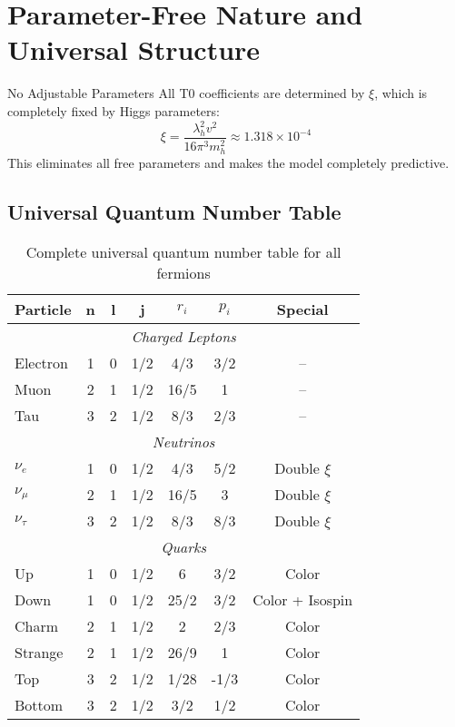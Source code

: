 \documentclass[12pt,a4paper]{article}
\begin{document}
	\section{Parameter-Free Nature and Universal Structure}
	\label{sec:parameter_free_nature}
	
	\begin{important}{No Adjustable Parameters}{}
		All T0 coefficients are determined by $\xi$, which is completely fixed by Higgs parameters:
		\begin{equation}
			\xi = \frac{\lambda_h^2 v^2}{16\pi^3 m_h^2} \approx 1.318 \times 10^{-4}
		\end{equation}
		This eliminates all free parameters and makes the model completely predictive.
	\end{important}
	
	\subsection{Universal Quantum Number Table}
	\label{subsec:universal_quantum_table}
	
	\begin{table}[H]
		\centering
		\begin{tabular}{lcccccc}
			\toprule
			\textbf{Particle} & \textbf{n} & \textbf{l} & \textbf{j} & \textbf{$r_i$} & \textbf{$p_i$} & \textbf{Special} \\
			\midrule
			\multicolumn{7}{c}{\textit{Charged Leptons}} \\
			\midrule
			Electron & 1 & 0 & 1/2 & 4/3 & 3/2 & -- \\
			Muon & 2 & 1 & 1/2 & 16/5 & 1 & -- \\
			Tau & 3 & 2 & 1/2 & 8/3 & 2/3 & -- \\
			\midrule
			\multicolumn{7}{c}{\textit{Neutrinos}} \\
			\midrule
			$\nu_e$ & 1 & 0 & 1/2 & 4/3 & 5/2 & Double $\xi$ \\
			$\nu_\mu$ & 2 & 1 & 1/2 & 16/5 & 3 & Double $\xi$ \\
			$\nu_\tau$ & 3 & 2 & 1/2 & 8/3 & 8/3 & Double $\xi$ \\
			\midrule
			\multicolumn{7}{c}{\textit{Quarks}} \\
			\midrule
			Up & 1 & 0 & 1/2 & 6 & 3/2 & Color \\
			Down & 1 & 0 & 1/2 & 25/2 & 3/2 & Color + Isospin \\
			Charm & 2 & 1 & 1/2 & 2 & 2/3 & Color \\
			Strange & 2 & 1 & 1/2 & 26/9 & 1 & Color \\
			Top & 3 & 2 & 1/2 & 1/28 & -1/3 & Color \\
			Bottom & 3 & 2 & 1/2 & 3/2 & 1/2 & Color \\
			\bottomrule
		\end{tabular}
		\caption{Complete universal quantum number table for all fermions}
		\label{tab:universal_quantum_numbers}
	\end{table}
	
\end{document}
